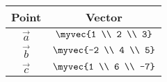 \begin{tabular}{|c|c|}
\hline
Point & Vector \\
\hline
$\vec{a}$ & $\myvec{1 \\ 2 \\ 3}$ \\
\hline
$\vec{b}$ & $\myvec{-2 \\ 4 \\ 5}$ \\
\hline
$\vec{c}$ & $\myvec{1 \\ 6 \\ -7}$ \\
\hline
\end{tabular}
